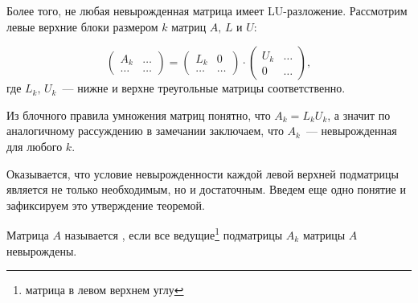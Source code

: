 \begin{exercise}
	Более того, не любая невырожденная матрица имеет LU-разложение. Рассмотрим левые верхние блоки размером $k$ матриц $A,\, L$ и
	$U$:

	\[
		\left(
		\begin{array}{c|c}
				A_{k}  & \ldots \\
				\hline
				\ldots & \ldots
			\end{array}
		\right) =
		\left(
		\begin{array}{c|c}
				L_{k}  & 0      \\
				\hline
				\ldots & \ldots
			\end{array}
		\right)\cdot
		\left(
		\begin{array}{c|c}
				U_{k} & \ldots \\
				\hline
				0     & \ldots
			\end{array}
		\right),
	\]
	где $L_k,\, U_k$~--- нижне и верхне треугольные матрицы соответственно.

	Из блочного правила умножения матриц понятно, что $A_k=L_kU_k$, а значит по аналогичному рассуждению в замечании заключаем,
	что $A_k$~--- невырожденная для любого $k$.
\end{exercise}

Оказывается, что условие невырожденности каждой левой верхней подматрицы является не только необходимым, но и
достаточным. Введем еще одно понятие и зафиксируем это утверждение теоремой.

\begin{definition}
	Матрица $A$ называется , если все ведущие\footnote{матрица в левом верхнем углу}
	подматрицы $A_k$ матрицы $A$ невырождены.
\end{definition}

